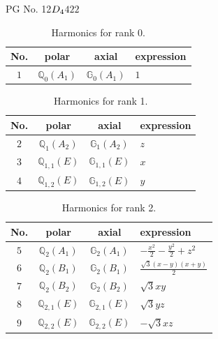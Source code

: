 \documentclass[fleqn,8pt,landscape]{jsarticle}
\begin{document}
\setcounter{MaxMatrixCols}{32}

\renewcommand{\tablename}{Table~}
\renewcommand{\figurename}{Figure~}
\begin{center}
\LARGE
PG No. 12\quad$D_{\rm 4}$\quad$422$\quad[ tetragonal ]
\end{center}
\begin{table}[ht!]
\begin{center}
\caption{Harmonics for rank 0.}
\renewcommand{\arraystretch}{1.3}
\begin{tabular}{cccl} \hline \hline
No. & polar & axial & expression \\ \hline
$ 1 $ & $ \mathbb{Q}_{0}(A_{1}) $ & $ \mathbb{G}_{0}(A_{1}) $ & $ 1 $ \\
 \hline \hline
\end{tabular}
\end{center}
\end{table}
\begin{table}[ht!]
\begin{center}
\caption{Harmonics for rank 1.}
\renewcommand{\arraystretch}{1.3}
\begin{tabular}{cccl} \hline \hline
No. & polar & axial & expression \\ \hline
$ 2 $ & $ \mathbb{Q}_{1}(A_{2}) $ & $ \mathbb{G}_{1}(A_{2}) $ & $ z $ \\
$ 3 $ & $ \mathbb{Q}_{1,1}(E) $ & $ \mathbb{G}_{1,1}(E) $ & $ x $ \\
$ 4 $ & $ \mathbb{Q}_{1,2}(E) $ & $ \mathbb{G}_{1,2}(E) $ & $ y $ \\
 \hline \hline
\end{tabular}
\end{center}
\end{table}
\begin{table}[ht!]
\begin{center}
\caption{Harmonics for rank 2.}
\renewcommand{\arraystretch}{1.3}
\begin{tabular}{cccl} \hline \hline
No. & polar & axial & expression \\ \hline
$ 5 $ & $ \mathbb{Q}_{2}(A_{1}) $ & $ \mathbb{G}_{2}(A_{1}) $ & $ - \frac{x^{2}}{2} - \frac{y^{2}}{2} + z^{2} $ \\
$ 6 $ & $ \mathbb{Q}_{2}(B_{1}) $ & $ \mathbb{G}_{2}(B_{1}) $ & $ \frac{\sqrt{3} \left(x - y\right) \left(x + y\right)}{2} $ \\
$ 7 $ & $ \mathbb{Q}_{2}(B_{2}) $ & $ \mathbb{G}_{2}(B_{2}) $ & $ \sqrt{3} x y $ \\
$ 8 $ & $ \mathbb{Q}_{2,1}(E) $ & $ \mathbb{G}_{2,1}(E) $ & $ \sqrt{3} y z $ \\
$ 9 $ & $ \mathbb{Q}_{2,2}(E) $ & $ \mathbb{G}_{2,2}(E) $ & $ - \sqrt{3} x z $ \\
 \hline \hline
\end{tabular}
\end{center}
\end{table}
\end{document}

